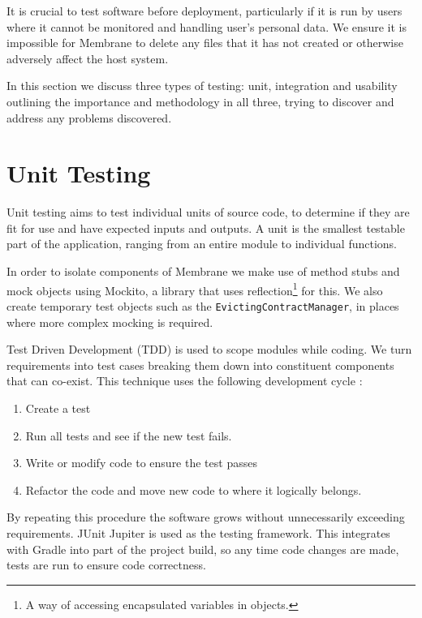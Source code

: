\documentclass[11pt, a4paper, twoside]{report}
\def\code#1{\texttt{#1}}
\begin{document}
It is crucial to test software before deployment, particularly if it is run by users where it cannot be monitored and handling user's personal data. We ensure it is impossible for Membrane to delete any files that it has not created or otherwise adversely affect the host system.

In this section we discuss three types of testing: unit, integration and usability outlining the importance and methodology in all three, trying to discover and address any problems discovered.

\section{Unit Testing}

Unit testing aims to test individual units of source code, to determine if they are fit for use and have expected inputs and outputs. \citep{huizinga2007automated} A unit is the smallest testable part of the application, ranging from an entire module to individual functions.

In order to isolate components of Membrane we make use of method stubs and mock objects \citep{osherove2015art} using Mockito, a library that uses reflection\footnote{A way of accessing encapsulated variables in objects.} for this. We also create temporary test objects such as the \code{EvictingContractManager}, in places where more complex mocking is required.

Test Driven Development (TDD) is used to scope modules while coding. We turn requirements into test cases breaking them down into constituent components that can co-exist. This technique uses the following development cycle \citep{beck2003test}:

\begin{enumerate}
 \item Create a test
 \item Run all tests and see if the new test fails.
 \item Write or modify code to ensure the test passes
 \item Refactor the code and move new code to where it logically belongs.
\end{enumerate}

By repeating this procedure the software grows without unnecessarily exceeding requirements. JUnit Jupiter is used as the testing framework. This integrates with Gradle into part of the project build, so any time code changes are made, tests are run to ensure code correctness.
\end{document}
